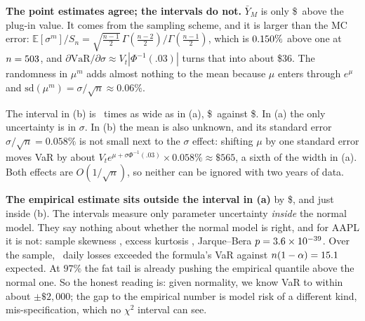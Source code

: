 \documentclass[12pt]{article}
\newcommand{\E}{\mathbb{E}}
\newcommand{\VaR}{\mathrm{VaR}}
\newcommand{\1}{\mathbf{1}}
\theoremstyle{remark}
\begin{document}
\begin{center}
\end{center}

\textbf{The point estimates agree; the intervals do not.} $\bar Y_M$ is only \$\YMinusPt\ above the
plug-in value. It comes from the sampling scheme, and it is larger than the MC error: $\E[\sigma^m]/S_n=\sqrt{\tfrac{n-1}2}\,\Gamma(\tfrac{n-2}2)/\Gamma(\tfrac{n-1}2)$,
which is $0.150\%$ above one at $n=503$, and $\partial\VaR/\partial\sigma\approx V_t|\Phi^{-1}(.03)|$
turns that into about \$36. The randomness in $\mu^m$ adds almost nothing to the mean because
$\mu$ enters through $e^{\mu}$ and $\mathrm{sd}(\mu^m)=\sigma/\sqrt n\approx0.06\%$.

The interval in (b) is \WidthRatio\ times as wide as in (a), \$\WidthB\ against \$\WidthA. In (a)
the only uncertainty is in $\sigma$. In (b) the mean is also unknown, and its standard error
$\sigma/\sqrt n=0.058\%$ is not small next to the $\sigma$ effect: shifting $\mu$ by one standard error
moves VaR by about $V_te^{\mu+\sigma\Phi^{-1}(.03)}\times0.058\%\approx\$565$, a sixth of the width in (a). Both effects are
$O(1/\sqrt n)$, so neither can be ignored with two years of data.

\textbf{The empirical estimate sits outside the interval in (a)} by \$\EmpOver, and just inside
(b). The intervals measure only parameter uncertainty \emph{inside} the normal model. They say
nothing about whether the normal model is right, and for AAPL it is not: sample skewness \Skew,
excess kurtosis \ExKurt, Jarque--Bera $p=3.6\times10^{-39}$. Over the sample, \NExceed\ daily losses exceeded
the formula's VaR against $n(1-\alpha)=15.1$ expected. At $97\%$ the fat tail is already
pushing the empirical quantile above the normal one. So the honest reading is: given normality,
we know VaR to within about $\pm\$2{,}000$; the gap to the empirical number is model risk of a
different kind, mis-specification, which no $\chi^2$ interval can see.

\end{document}
